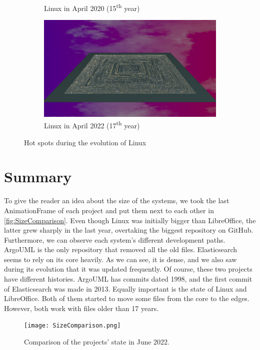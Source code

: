\begin{figure}[ht]
\begin{subfigure}{0.48\textwidth}
        \caption{Linux in April 2020 (15\textsuperscript{th} year)} 
        \label{fig:Linux_V7_S5}
    \end{subfigure}\hspace*{\fill}
    \begin{subfigure}{0.48\textwidth}
        \includegraphics[width=\linewidth]{Linux/Animation017.png}
        \caption{Linux in April 2022 (17\textsuperscript{th} year)} 
        \label{fig:Linux_V7_S6}
    \end{subfigure}
    
    \caption{Hot spots during the evolution of Linux} 
    \label{fig:Linux_V7}
\end{figure}

\clearpage
\section{Summary}

To give the reader an idea about the size of the systems, we took the last AnimationFrame of each project and put them next to each other in \autoref{fig:SizeComparison}. Even though Linux was initially bigger than LibreOffice, the latter grew sharply in the last year, overtaking the biggest repository on GitHub. Furthermore, we can observe each system's different development paths. ArgoUML is the only repository that removed all the old files. Elasticsearch seems to rely on its core heavily. As we can see, it is dense, and we also saw during its evolution that it was updated frequently. Of course, these two projects have different histories. ArgoUML has commits dated 1998, and the first commit of Elasticsearch was made in 2013. Equally important is the state of Linux and LibreOffice. Both of them started to move some files from the core to the edges. However, both work with files older than 17 years. 

\begin{figure}[ht]
    \centering
    \texttt{[image: SizeComparison.png]}
    \caption{Comparison of the projects' state in June 2022.} 
    \label{fig:SizeComparison}
\end{figure}

